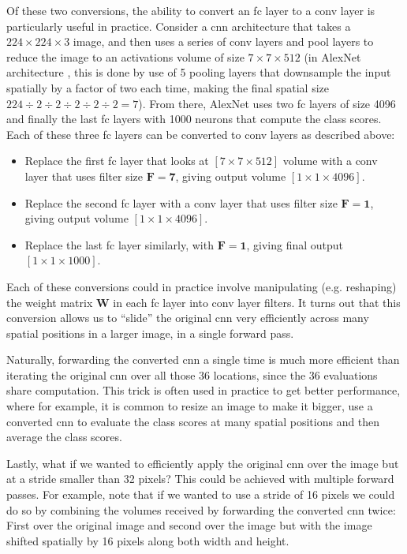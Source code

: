 Of these two conversions, the ability to convert an \acrshort{fc} layer to a
\acrshort{conv} layer is particularly useful in practice. Consider a
\acrshort{cnn} architecture that takes a $224\times224\times3$ image, and then
uses a series of \acrshort{conv} layers and \acrshort{pool} layers to reduce
the image to an activations volume of size $7\times7\times512$ (in AlexNet
architecture \cite{Krizhevsky:2017:ICD:3098997.3065386}, this is done by use of
5 pooling layers that downsample the input spatially by a factor of two each
time, making the final spatial size $224 \div 2 \div 2 \div 2 \div 2 \div 2 =
7$). From there, AlexNet uses two \acrshort{fc} layers of size 4096 and
finally the last \acrshort{fc} layers with 1000 neurons that compute the class
scores. Each of these three \acrshort{fc} layers can be converted to
\acrshort{conv} layers as described above:
\begin{itemize}
    \item Replace the first \acrshort{fc} layer that looks at
    $[7\times7\times512]$ volume with a \acrshort{conv} layer that uses filter
    size $\boldsymbol{F=7}$, giving output volume $[1\times1\times4096]$.
    \item Replace the second \acrshort{fc} layer with a \acrshort{conv} layer
    that uses filter size $\boldsymbol{F=1}$, giving output volume
    $[1\times1\times4096]$.
    \item Replace the last \acrshort{fc} layer similarly, with
    $\boldsymbol{F=1}$, giving final output $[1\times1\times1000]$.
\end{itemize}


Each of these conversions could in practice involve manipulating (e.g.
reshaping) the weight matrix $\boldsymbol{W}$ in each \acrshort{fc} layer
into \acrshort{conv} layer filters. It turns out that this conversion allows us
to ``slide'' the original \acrshort{cnn} very efficiently across many spatial
positions in a larger image, in a single forward pass.


Naturally, forwarding the converted \acrshort{cnn} a single time is much more
efficient than iterating the original \acrshort{cnn} over all those 36
locations, since the 36 evaluations share computation. This trick is often
used in practice to get better performance, where for example, it is common to
resize an image to make it bigger, use a converted \acrshort{cnn} to evaluate
the class scores at many spatial positions and then average the class scores.


Lastly, what if we wanted to efficiently apply the original \acrshort{cnn} over
the image but at a stride smaller than 32 pixels? This could be achieved with
multiple forward passes. For example, note that if we wanted to use a stride of
16 pixels we could do so by combining the volumes received by forwarding the
converted \acrshort{cnn} twice: First over the original image and second over
the image but with the image shifted spatially by 16 pixels along both width
and height.

